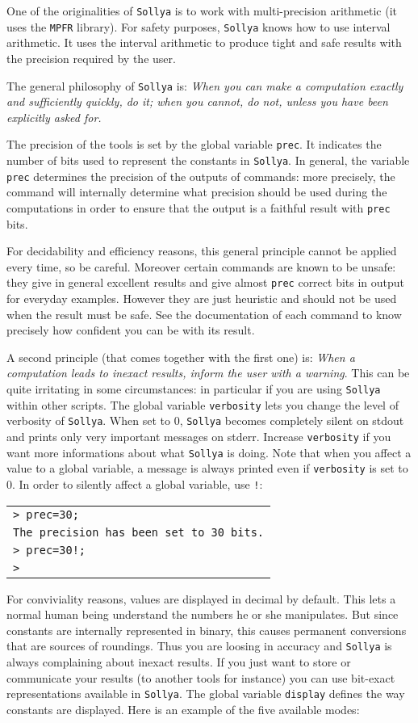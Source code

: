 \documentclass[a4paper]{article}
\newcommand{\com}[1]{\texttt{#1}}
\newcommand{\key}[1]{\texttt{#1}}
\newcommand{\sollya}{\texttt{Sollya}\xspace}
\newcommand{\code}[1]{
\begin{center}
\begin{tabular}{|p{14.8cm}|}
\hline
#1
\hline
\end{tabular}
\end{center}
}
\newcommand{\ligne}[1]{\texttt{#1}\\}
\begin{document}
One of the originalities of \sollya is to work with multi-precision arithmetic (it uses the \texttt{MPFR} library). For safety purposes, \sollya knows how to use interval arithmetic. It uses the interval arithmetic to produce tight and safe results with the precision required by the user.

The general philosophy of \sollya is: \emph{When you can make a computation exactly and sufficiently quickly, do it; when you cannot, do not, unless you have been explicitly asked for.}

The precision of the tools is set by the global variable \key{prec}. It indicates the number of bits used to represent the constants in \sollya. In general, the variable \key{prec} determines the precision of the outputs of commands: more precisely, the command will internally determine what precision should be used during the computations in order to ensure that the output is a faithful result with \key{prec} bits.

For decidability and efficiency reasons, this general principle cannot be applied every time, so be careful. Moreover certain commands are known to be unsafe: they give in general excellent results and give almost \key{prec} correct bits in output for everyday examples. However they are just heuristic and should not be used when the result must be safe. See the documentation of each command to know precisely how confident you can be with its result.

A second principle (that comes together with the first one) is: \emph{When a computation leads to inexact results, inform the user with a warning}. This can be quite irritating in some circumstances: in particular if you are using \sollya within other scripts. The global variable \key{verbosity} lets you change the level of verbosity of \sollya. When set to $0$, \sollya becomes completely silent on stdout and prints only very important messages on stderr. Increase \key{verbosity} if you want more informations about what \sollya is doing. Note that when you affect a value to a global variable, a message is always printed even if \com{verbosity} is set to $0$. In order to silently affect a global variable, use \texttt{!}:

\code{
\ligne{> prec=30;}
\ligne{The precision has been set to 30 bits.}
\ligne{> prec=30!;}
\ligne{>}
}

For conviviality reasons, values are displayed in decimal by default. This lets a normal human being understand the numbers he or she manipulates. But since constants are internally represented in binary, this causes permanent conversions that are sources of roundings. Thus you are loosing in accuracy and \sollya is always complaining about inexact results. If you just want to store or communicate your results (to another tools for instance) you can use bit-exact representations available in \sollya. The global variable \key{display} defines the way constants are displayed. Here is an example of the five available modes:
\end{document}
